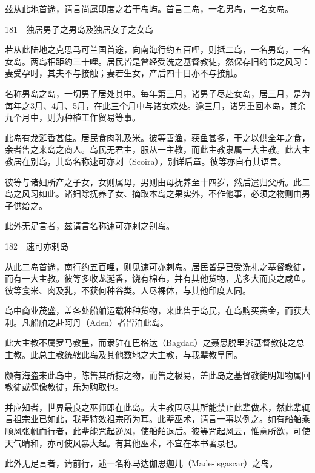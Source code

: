 \documentclass[12pt,UTF8]{ctexbook}
\begin{document}
兹从此地首途，请言尚属印度之若干岛屿。首言二岛，一名男岛，一名女岛。





181　独居男子之男岛及独居女子之女岛

若从此陆地之克思马可兰国首途，向南海行约五百哩，则抵二岛，一名男岛，一名女岛。两岛相距约三十哩。居民皆是曾经受洗之基督教徒，然保存旧约书之风习：妻受孕时，其夫不与接触；妻若生女，产后四十日亦不与接触。

名称男岛之岛，一切男子居处其中。每年第三月，诸男子尽赴女岛，居三月，是为每年之3月、4月、5月，在此三个月中与诸女欢处。逾三月，诸男重回本岛，其余九个月中，则为种植工作贸易等事。

此岛有龙涎香甚佳。居民食肉乳及米。彼等善渔，获鱼甚多，干之以供全年之食，余者售之来岛之商人。岛民无君主，服从一主教，而此主教隶属一大主教。此大主教居在别岛，其岛名称速可亦剌（Scoira），别详后章。彼等亦自有其语言。

彼等与诸妇所产之子女，女则属母，男则由母抚养至十四岁，然后遣归父所。此二岛之风习如此。诸妇除抚养子女、摘取本岛之果实外，不作他事，必须之物则由男子供给之。

此外无足言者，兹请言名称速可亦剌之别岛。





182　速可亦剌岛

从此二岛首途，南行约五百哩，则见速可亦剌岛。居民皆是已受洗礼之基督教徒，而有一大主教。彼等多收龙涎香，饶有棉布，并有其他货物，尤多大而良之咸鱼。彼等食米、肉及乳，不获何种谷类。人尽裸体，与其他印度人同。

岛中商业茂盛，盖各处船舶运载种种货物，来此售于岛民，在岛购买黄金，而获大利。凡船舶之赴阿丹（Aden）者皆泊此岛。

此大主教不属罗马教皇，而隶驻在巴格达（Bagdad）之聂思脱里派基督教徒之总主教。此总主教统辖此岛及其他数地之大主教，与我辈教皇同。

颇有海盗来此岛中，陈售其所掠之物，而售之极易，盖此岛之基督教徒明知物属回教徒或偶像教徒，乐为购取也。

并应知者，世界最良之巫师即在此岛。大主教固尽其所能禁止此辈做术，然此辈辄言祖宗业已如此，我辈特效祖宗所为耳。此辈巫术，请言一事以例之。如有船舶乘顺风张帆而行者，此辈能咒起逆风，使船舶退后。彼等咒起风云，惟意所欲，可使天气晴和，亦可使风暴大起。有其他巫术，不宜在本书著录也。

此外无足言者，请前行，述一名称马达伽思迦儿（Made-isgascar）之岛。
\end{document}
